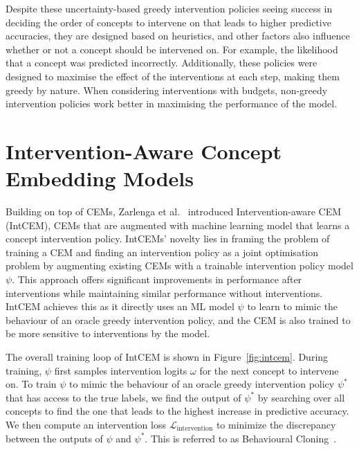 
Despite these uncertainty-based 
greedy intervention policies seeing success 
in deciding the order of concepts to intervene on that leads to higher predictive accuracies,
they are designed based on heuristics, and other factors also influence whether or not a concept should be intervened on. For example, the likelihood that a concept was predicted incorrectly. Additionally, these policies were designed to maximise the effect of the interventions at each step, making them greedy by nature. When considering interventions with budgets,
non-greedy intervention policies work better in maximising the performance of the model.


\section{Intervention-Aware Concept Embedding Models} %

Building on top of CEMs, Zarlenga et al.~\cite{intcem} introduced 
Intervention-aware CEM (IntCEM), CEMs that are augmented
with machine learning model
that learns a concept intervention policy. IntCEMs' novelty
lies in framing the problem of training a CEM and finding
an intervention policy as a joint optimisation problem by augmenting
existing CEMs with a trainable intervention policy model $\psi$. 
This approach offers significant improvements in performance after 
interventions while maintaining similar performance without 
interventions. 
IntCEM achieves this as it directly uses an ML
model $\psi$ to
learn to mimic the behaviour of an oracle
greedy intervention policy, 
and the CEM is also trained to be more sensitive to interventions
by the model. 


The overall training loop of IntCEM 
is shown in Figure~\ref{fig:intcem}.
During training, $\psi$ first samples intervention
logits $\omega$ for the next concept to intervene on.
To train $\psi$ to mimic 
the behaviour of an oracle 
greedy intervention policy $\psi^*$ that has access to the true
labels, we find the output of $\psi^*$
by searching over all concepts to find the one that 
leads to the highest increase in predictive accuracy.
We then compute an intervention loss $\mathcal{L}_{\text{intervention}}$ to minimize the discrepancy between the outputs of $\psi$ and $\psi^*$.
This is referred to as Behavioural
Cloning~\cite{behavioural-cloning}.

